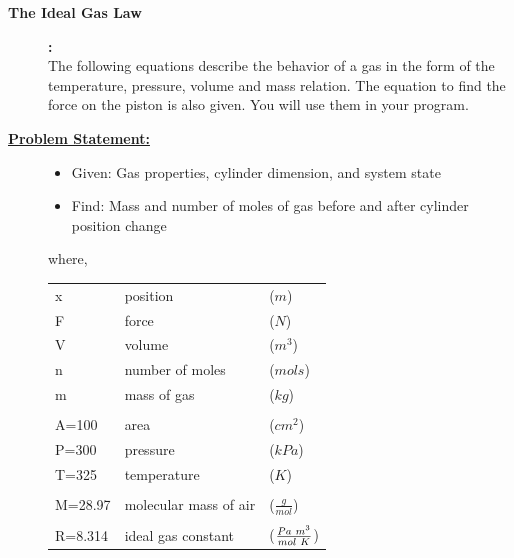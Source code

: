 \documentclass[12pt]{article}
\begin{document}
\begin{description}[labelindent=1cm]
\begin{description}
      \item [\textbf{ The Ideal Gas Law}] \textbf{ \Large :}\\  
            The following equations describe the behavior of a gas in the form of the temperature, pressure, volume and mass relation. The equation to find the force on the piston is also given. You will use them in your program. \\

                \hspace{15mm}     \hspace{15mm}  
      
   \item[\textbf{\underline{Problem Statement:}}] \hfill \vspace{0mm}

	\begin{itemize}

		\item Given: Gas properties, cylinder dimension, and system state
		
		\item Find: Mass and number of moles of gas before and after cylinder position change
		 
	\end{itemize}      

            \newpage                     
            where,\\
            
            \begin{multicols}{2}
            
            \begin{tabular}{lll}
            x &position &($m$)   \\
            F &force    &($N$)   \\
            V &volume   &($m^3$) \\        
            n &number of moles &($mols$) \\   
            m & mass of gas&($kg$)      \\ 
            \\
            A=100 &area     &($cm^2$)  \\
            P=300 &pressure &($kPa$) \\ 
            T=325 & temperature &($K$) \\\\ 
            M=28.97 & molecular mass of air &($\frac{g}{mol}$)       \\\\ 
            R=8.314 & ideal gas constant &($\frac{Pa\hspace{1mm}m^3}{mol\hspace{1mm}K}$)\\ 
            \end{tabular}\\


\end{multicols}
\end{description}
\end{description}
\end{document}
